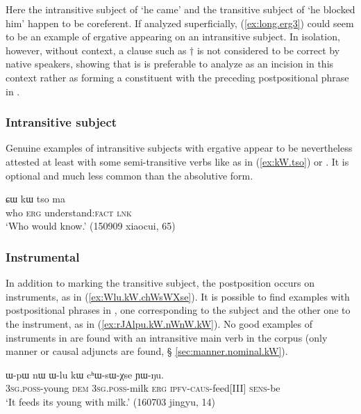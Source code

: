 Here the intransitive subject of   `he came' and the transitive subject of    `he blocked him' happen to be coreferent. If analyzed superficially, (\ref{ex:long.erg3}) could seem to be an example of ergative appearing on an intransitive subject. In isolation, however, without context, a clause such as $\dagger$ is not considered to be correct by native speakers, showing that is is preferable to analyze   as an incision in this context rather as forming a constituent with the preceding postpositional phrase in .

\subsubsection{Intransitive subject} \label{sec:S.kW}
Genuine examples of intransitive subjects with ergative appear to be nevertheless attested at least with some semi-transitive verbs like  as in (\ref{ex:kW.tso}) or . It is optional and much less common than the absolutive form.

\begin{exe}
\ex \label{ex:kW.tso}
\gll ɕɯ kɯ tso ma \\
who \textsc{erg} understand:\textsc{fact} \textsc{lnk} \\
\glt `Who would know.' (150909 xiaocui, 65)
\end{exe}

\subsubsection{Instrumental} \label{sec:instr.kW}
In addition to marking the transitive subject, the postposition  occurs on instruments, as in (\ref{ex:Wlu.kW.chWsWXse}). It is possible to find examples with  postpositional phrases in , one corresponding to the subject and the other one to the instrument, as in (\ref{ex:rJAlpu.kW.nWnW.kW}). No good examples of instruments in  are found with an intransitive main verb in the corpus (only manner or causal adjuncts are found, § \ref{sec:manner.nominal.kW}).

\begin{exe}
\ex \label{ex:Wlu.kW.chWsWXse}
 \gll ɯ-pɯ nɯ ɯ-lu kɯ cʰɯ-sɯ-χse ɲɯ-ŋu. \\
 \textsc{3sg}.\textsc{poss}-young \textsc{dem} \textsc{3sg}.\textsc{poss}-milk \textsc{erg} \textsc{ipfv}-\textsc{caus}-feed[III] \textsc{sens}-be \\
\glt `It feeds its young with milk.' (160703 jingyu, 14)
\end{exe}

